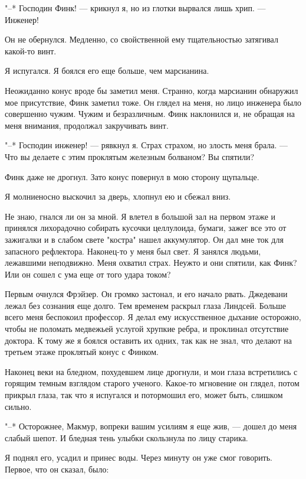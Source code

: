 "--* Господин Финк! --- крикнул я,  но  из  глотки  вырвался  лишь  хрип.  ---
Инженер!

Он не обернулся. Медленно, со свойственной ему тщательностью  затягивал
какой-то винт.

Я испугался. Я боялся его еще больше, чем марсианина.

Неожиданно конус  вроде  бы  заметил  меня.  Странно,  когда  марсианин
обнаружил мое присутствие, Финк заметил тоже. Он глядел на меня,  но  лицо
инженера было совершенно чужим. Чужим и безразличным. Финк  наклонился  и,
не обращая на меня внимания, продолжал закручивать винт.

"--* Господин инженер! --- рявкнул я. Страх страхом, но злость меня брала. ---
Что вы делаете с этим проклятым железным болваном? Вы спятили?

Финк даже не дрогнул. Зато конус повернул в мою сторону щупальце.

Я молниеносно выскочил за дверь, хлопнул ею и сбежал вниз.

Не знаю, гнался ли он за мной. Я влетел в большой зал на первом этаже и
принялся лихорадочно собирать кусочки целлулоида, бумаги, зажег все это от
зажигалки и в слабом свете "костра" нашел аккумулятор. Он дал мне ток  для
запасного рефлектора. Наконец-то  у  меня  был  свет.  Я  занялся  людьми,
лежавшими неподвижно. Меня охватил страх. Неужто и они спятили, как  Финк?
Или он сошел с ума еще от того удара током?

Первым очнулся  Фрэйзер.  Он  громко  застонал,  и  его  начало  рвать.
Джедевани лежал  без  сознания  еще  долго.  Тем  временем  раскрыл  глаза
Линдсей. Больше всего меня беспокоил профессор. Я делал ему  искусственное
дыхание осторожно, чтобы не поломать медвежьей услугой  хрупкие  ребра,  и
проклинал отсутствие доктора. К тому же я боялся оставить  их  одних,  так
как не знал, что делают на третьем этаже проклятый конус с Финком.

Наконец  веки  на  бледном,  похудевшем  лице  дрогнули,  и  мои  глаза
встретились с горящим темным взглядом старого ученого. Какое-то  мгновение
он глядел, потом прикрыл глаза, так что  я  испугался  и  потормошил  его,
может быть, слишком сильно.

"--* Осторожнее, Макмур, вопреки вашим усилиям я еще жив, --- дошел до  меня
слабый шепот. И бледная тень улыбки скользнула по лицу старика.

Я поднял его, усадил и принес воды. Через минуту он уже смог  говорить.
Первое, что он сказал, было:

